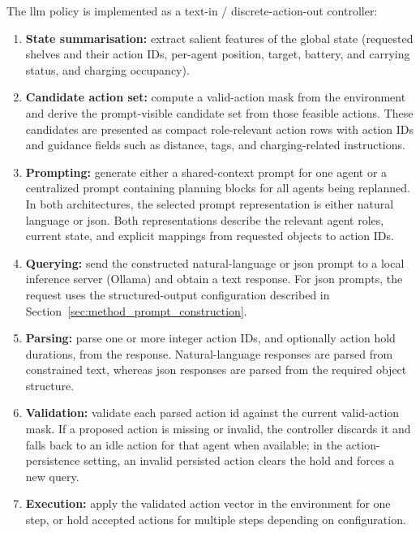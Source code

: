 The \gls{llm} policy is implemented as a text-in / discrete-action-out controller:
\begin{enumerate}
    \item \textbf{State summarisation:} extract salient features of the global state (requested shelves and their action IDs, per-agent position, target, battery, and carrying status, and charging occupancy).
    \item \textbf{Candidate action set:} compute a valid-action mask from the environment and derive the prompt-visible candidate set from those feasible actions. These candidates are presented as compact role-relevant action rows with action IDs and guidance fields such as distance, tags, and charging-related instructions.
    \item \textbf{Prompting:} generate either a shared-context prompt for one agent or a centralized prompt containing planning blocks for all agents being replanned. In both architectures, the selected prompt representation is either natural language or \gls{json}. Both representations describe the relevant agent roles, current state, and explicit mappings from requested objects to action IDs.
    \item \textbf{Querying:} send the constructed natural-language or \gls{json} prompt to a local inference server (Ollama) and obtain a text response. For \gls{json} prompts, the request uses the structured-output configuration described in Section~\ref{sec:method_prompt_construction}.
    \item \textbf{Parsing:} parse one or more integer action IDs, and optionally action hold durations, from the response. Natural-language responses are parsed from constrained text, whereas \gls{json} responses are parsed from the required object structure.
    \item \textbf{Validation:} validate each parsed action id against the current valid-action mask. If a proposed action is missing or invalid, the controller discards it and falls back to an idle action for that agent when available; in the action-persistence setting, an invalid persisted action clears the hold and forces a new query.
    \item \textbf{Execution:} apply the validated action vector in the environment for one step, or hold accepted actions for multiple steps depending on configuration.
\end{enumerate}

